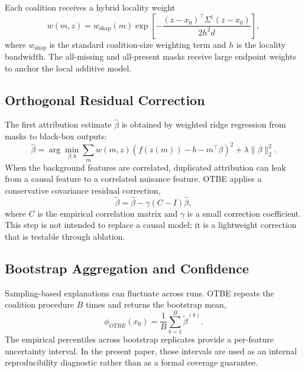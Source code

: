 \documentclass[10pt,conference,letterpaper]{IEEEtran}
\newcommand{\method}{OTBE}
\begin{document}
Each coalition receives a hybrid locality weight
\begin{equation}
    w(m,z)=w_{\mathrm{shap}}(m)\exp\left[-\frac{(z-x_0)^\top \Sigma^\dagger (z-x_0)}{2h^2d}\right],
\end{equation}
where $w_{\mathrm{shap}}$ is the standard coalition-size weighting term and $h$ is the locality bandwidth.  The all-missing and all-present masks receive large endpoint weights to anchor the local additive model.

\subsection{Orthogonal Residual Correction}
The first attribution estimate $\hat{\beta}$ is obtained by weighted ridge regression from masks to black-box outputs:
\begin{equation}
    \hat{\beta}=\arg\min_{\beta,b}\sum_{m}w(m,z)\left(f(z(m))-b-m^\top\beta\right)^2+\lambda\|\beta\|_2^2 .
\end{equation}
When the background features are correlated, duplicated attribution can leak from a causal feature to a correlated nuisance feature.  \method{} applies a conservative covariance residual correction,
\begin{equation}
    \tilde{\beta}=\hat{\beta}-\gamma(C-I)\hat{\beta},
\end{equation}
where $C$ is the empirical correlation matrix and $\gamma$ is a small correction coefficient.  This step is not intended to replace a causal model; it is a lightweight correction that is testable through ablation.

\subsection{Bootstrap Aggregation and Confidence}
Sampling-based explanations can fluctuate across runs.  \method{} repeats the coalition procedure $B$ times and returns the bootstrap mean,
\begin{equation}
    \phi_{\method}(x_0)=\frac{1}{B}\sum_{b=1}^{B}\tilde{\beta}^{(b)} .
\end{equation}
The empirical percentiles across bootstrap replicates provide a per-feature uncertainty interval.  In the present paper, those intervals are used as an internal reproducibility diagnostic rather than as a formal coverage guarantee.
\end{document}
